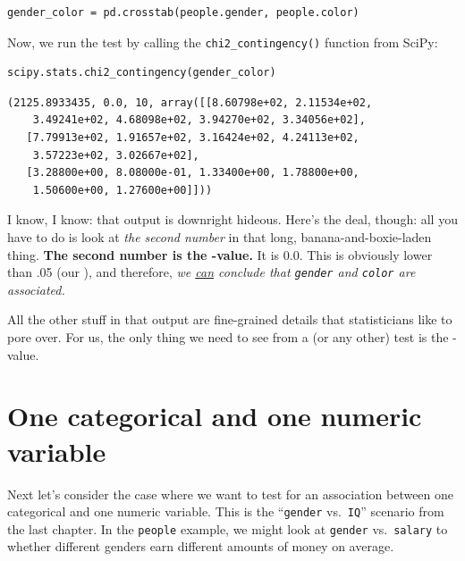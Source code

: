 \begin{Verbatim}[fontsize=\small,samepage=true,frame=single,framesep=3mm]
gender_color = pd.crosstab(people.gender, people.color)
\end{Verbatim}

Now, we run the test by calling the \texttt{chi2\_contingency()} function from
SciPy:

\begin{Verbatim}[fontsize=\footnotesize,samepage=true,frame=single,framesep=3mm]
scipy.stats.chi2_contingency(gender_color)
\end{Verbatim}
\vspace{-.2in}

\begin{Verbatim}[fontsize=\small,samepage=true,frame=leftline,framesep=5mm,framerule=1mm]
(2125.8933435, 0.0, 10, array([[8.60798e+02, 2.11534e+02, 
    3.49241e+02, 4.68098e+02, 3.94270e+02, 3.34056e+02],
   [7.79913e+02, 1.91657e+02, 3.16424e+02, 4.24113e+02, 
    3.57223e+02, 3.02667e+02],
   [3.28800e+00, 8.08000e-01, 1.33400e+00, 1.78800e+00, 
    1.50600e+00, 1.27600e+00]]))
\end{Verbatim}

I know, I know: that output is downright hideous. Here's the deal, though: all
you have to do is look at \textit{the second number} in that long,
banana-and-boxie-laden thing. \textbf{The second number is the -value.} It is
0.0. This is obviously lower than .05 (our ), and therefore, \textit{we
\underline{can} conclude that \texttt{gender} and \texttt{color} are
associated.}

All the other stuff in that output are fine-grained details that statisticians
like to pore over. For us, the only thing we need to see from a  (or
any other) test is the -value.

\section[One categorical, one numeric variable]{One categorical and one numeric variable}

Next let's consider the case where we want to test for an association between
one categorical and one numeric variable. This is the ``\texttt{gender}
vs.~\texttt{IQ}'' scenario from the last chapter. In the \texttt{people}
example, we might look at \texttt{gender} vs.~\texttt{salary} to whether
different genders earn different amounts of money on average.


